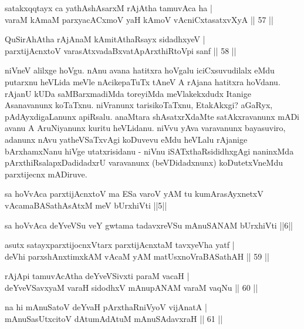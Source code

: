 \begin{shl}
satakxqqtayx ca yathAshAsarxM rAjA\s tha tamuvAca ha | \\
varaM kAmaM parxyacACxmoV yaH kAmoV vAcniCxtasatxvXyA \hfill|| 57 || 
\end{shl}

\begin{shl}
QuSirAhAtha rAjAnaM kAmitAthaRsayx sidadhxyeV | \\
parxtijAcnxtoV varasAtxvadaBxvatA\s pArxthiRtoV\s pi sanf \hfill|| 58 || 
\end{shl}

\begin{artha}
niVneV alilxge hoVgu. nAnu avana hatitxra hoVgalu iciCxsuvudilalx eMdu 
putarxnu heVLida meVle nAcikepaTuTx tAneV A rAjana hatitxra hoVdanu. 
rAjanU kUDa saMBarxmadiMda toreyiMda meVlakekxdudx Itanige Asanavanunx 
koTaTxnu. niVranunx tarisikoTaTxnu, EtakAkxgi? aGaRyx, 
pAdAyxdigaLanunx apiRsalu. anaMtara shAsatxrXdaMte satAkxravanunx mADi 
avanu A AruNiyanunx kuritu heVLidanu. niVvu yAva varavanunx 
bayasuviro, adanunx nAvu yatheVSaTxvAgi koDuvevu eMdu heVLalu rAjanige 
bArxhamxNanu hiVge utatxrisidanu - niVnu iSATxthaRsididhxgAgi 
naninxMda pArxthiRsalapxDadidadxrU varavanunx (beVDidadxnunx) 
koDutetxVneMdu parxtijecnx mADiruve.
\end{artha}


\begin{shl}
sa hoVvAca parxtijAcnxtoV ma ESa varoV yAM tu kumArasAyxnetxV vAcamaBASathAsAtxM meV bUrxhiVti ||5||
\end{shl}

\begin{shl}
sa hoVvAca deYveVSu veY gwtama tadavxreVSu mAnuSANAM bUrxhiVti ||6||
\end{shl}

\begin{shl}
asutx satayxparxtijocnxV\s tarx parxtijAcnxtaM tavxyeVha yatf | \\
deVhi parxshAnxtimxkAM vAcaM yAM matUsxnoVraBASathAH \hfill|| 59 || 
\end{shl}

\begin{shl}
rAjA\s pi tamuvAcAtha deYveVSivxti paraM vacaH | \\
deYveVSavxyaM varaH sidodhxV mAnupANAM varaM vaqNu \hfill|| 60 || 
\end{shl}

\begin{shl}
na hi mAnuSatoV deYvaH pArxthaRniVyoV vijAnatA | \\
mAnuSasUtxcitoV dAtumAdAtuM mAnuSAdavxraH \hfill|| 61 || 
\end{shl}

